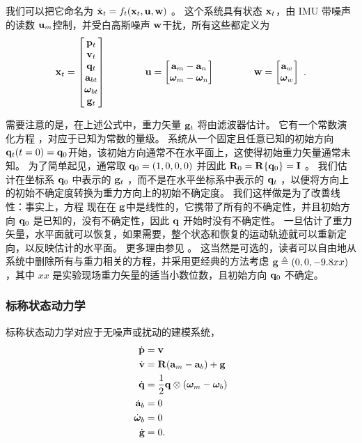 %
我们可以把它命名为 $\dot{{\bf x}}_t=f_t({\bf x}_t,{\bf u},{\bf w})$ 。 
这个系统具有状态 ${\bf x}_t$，由 IMU 带噪声的读数 ${\bf u}_m$控制，并受白高斯噪声 ${\bf w}$干扰，所有这些都定义为
%
\begin{equation}
{\bf x}_t = \begin{bmatrix}
{\bf p}_t \\ {\bf v}_t \\ {\bf q}_t \\ {\bf a}_{bt} \\ {\bm \omega}_{bt} \\ {\bf g}_t
\end{bmatrix} 
\qquad\qquad
{\bf u} = \begin{bmatrix}
{\bf a}_m - {\bf a}_n \\ {\bm \omega}_m - {\bm \omega}_n
\end{bmatrix}
\qquad\qquad
{\bf w} = \begin{bmatrix}
{\bf a}_w \\ {\bm \omega}_w
\end{bmatrix}~.
\end{equation}
%

\bigskip
需要注意的是，在上述公式中，重力矢量 ${\bf g}_t$ 将由滤波器估计。 
它有一个常数演化方程 ，对应于已知为常数的量级。 
系统从一个固定且任意已知的初始方向 ${\bf q}_t(t=0)={\bf q}_0$开始，该初始方向通常不在水平面上，这使得初始重力矢量通常未知。 
为了简单起见，通常取 ${\bf q}_0=(1, 0, 0, 0)$ 并因此 ${\bf R}_0={\bf R}\{{\bf q}_0\}={\bf I}$ 。 
我们估计在坐标系 ${\bf q}_0$ 中表示的 ${\bf g}_t$ ，而不是在水平坐标系中表示的 ${\bf q}_t$ ，以便将方向上的初始不确定度转换为重力方向上的初始不确定度。 
我们这样做是为了改善线性：事实上，方程  现在在 ${\bf g}$中是线性的，它携带了所有的不确定性，并且初始方向 ${\bf q}_0$ 是已知的，没有不确定性，因此 ${\bf q}$ 开始时没有不确定性。 
一旦估计了重力矢量，水平面就可以恢复，如果需要，整个状态和恢复的运动轨迹就可以重新定向，以反映估计的水平面。 
更多理由参见 \citep{LUPTON-09} 。 
这当然是可选的，读者可以自由地从系统中删除所有与重力相关的方程，并采用更经典的方法考虑 ${\bf g}\triangleq(0,0,-9.8xx)$，其中 $xx$ 是实验现场重力矢量的适当小数位数，且初始方向 ${\bf q}_0$ 不确定。



\subsubsection{标称状态动力学}

标称状态动力学对应于无噪声或扰动的建模系统，
%
\begin{subequations}
%
\begin{align}
\dot{{\bf p}} &= {\bf v} \label{equ:pdot}\\
\dot{{\bf v}} &= {\bf R}({\bf a}_m - {\bf a}_b) + {\bf g} \label{equ:vdot}\\
\dot{{\bf q}} &= \frac{1}{2}{\bf q}\otimes({\bm \omega}_m - {\bm \omega}_b) \\
\dot{{\bf a}}_b &= 0 \\
\dot{{\bm \omega}}_b &= 0 \\
\dot{{\bf g}} &= 0 .
\end{align}%
\end{subequations}
%




